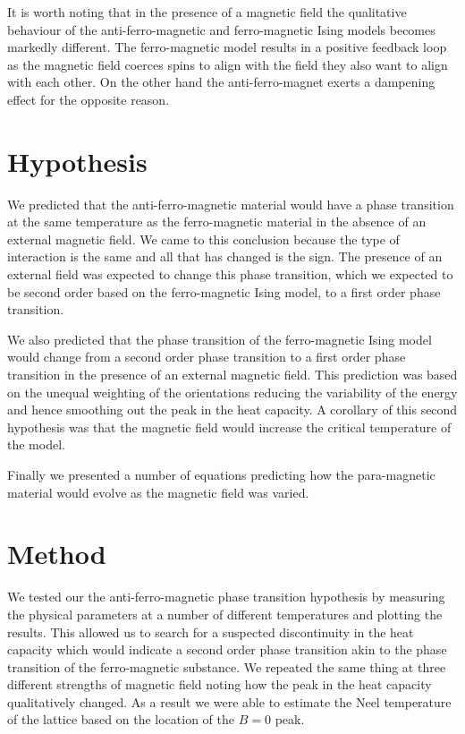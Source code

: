 \documentclass[a4paper, twocolumn]{article}
\begin{document}
It is worth noting that in the presence of a magnetic field the %
qualitative behaviour of the anti-ferro-magnetic and ferro-magnetic %
Ising models becomes markedly different. The ferro-magnetic model %
results in a positive feedback loop as the magnetic field coerces %
spins to align with the field they also want to align with each other.
On the other hand the anti-ferro-magnet exerts a dampening effect %
for the opposite reason. 


\section*{Hypothesis}
We predicted that the anti-ferro-magnetic material would have a phase %
transition at the same temperature as the ferro-magnetic material in %
the absence of an external magnetic field. We came to this conclusion %
because the type of interaction is the same and all that has changed is %
the sign. The presence of an external field was expected to change %
this phase transition, which we expected to be second order based on %
the ferro-magnetic Ising model, to a first order phase transition. 


We also predicted that the phase transition of the ferro-magnetic %
Ising model would change from a second order phase transition to a first %
order phase transition in the presence of an external magnetic field. %
This prediction was based on the unequal weighting of the orientations %
reducing the variability of the energy and hence smoothing out the %
peak in the heat capacity. A corollary of this second hypothesis was %
that the magnetic field would increase the critical temperature of %
the model. 


Finally we presented a number of equations predicting how the %
para-magnetic material would evolve as the magnetic field was varied. %


\section*{Method}
We tested our the anti-ferro-magnetic phase transition hypothesis by %
measuring the physical parameters at a number of different temperatures %
and plotting the results. This allowed us to search for a suspected %
discontinuity in the heat capacity which would indicate a second order %
phase transition akin to the phase transition of the ferro-magnetic %
substance. We repeated the same thing at three different strengths of %
magnetic field noting how the peak in the heat capacity qualitatively %
changed. As a result we were able to estimate the Neel temperature of %
the lattice based on the location of the \(B = 0\) peak.
\end{document}
